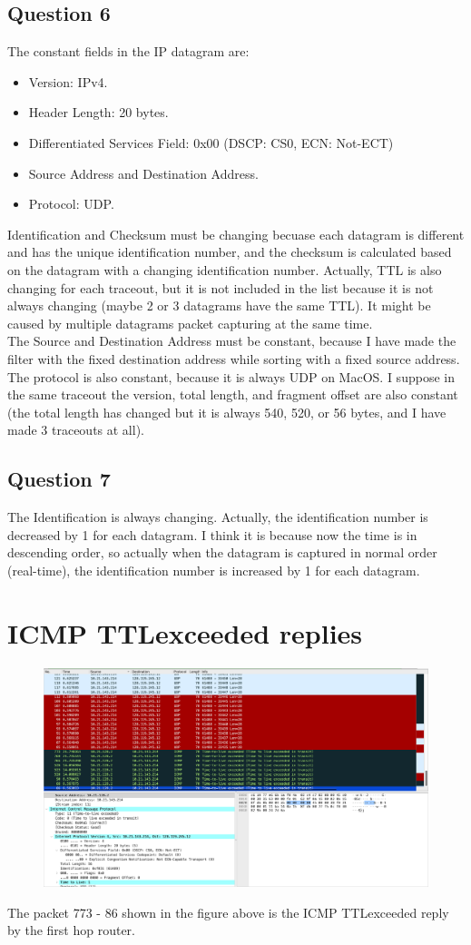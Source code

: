 \documentclass{article}
\begin{document}
\begin{CJK*}{UTF8}{gbsn}
\subsection{Question 6}
The constant fields in the IP datagram are:
\begin{itemize}
    \item Version: IPv4.
    \item Header Length: 20 bytes.
    \item Differentiated Services Field: 0x00 (DSCP: CS0, ECN: Not-ECT)
    \item Source Address and Destination Address.
    \item Protocol: UDP.
\end{itemize}
Identification and Checksum must be changing becuase each datagram is different and has the unique identification number, and the checksum is calculated based on the datagram with a changing identification number. Actually,
TTL is also changing for each traceout, but it is not included in the list because it is not always changing (maybe 2 or 3 datagrams have the same TTL). It might be caused by multiple datagrams packet capturing at the same time.
\\The Source and Destination Address must be constant, because I have made the filter with the fixed destination address while sorting with a fixed source address. The
protocol is also constant, because it is always UDP on MacOS. I suppose in the same traceout the version, total length, and fragment offset are also constant (the total length has changed but it is always 540, 520, or 56 bytes,
and I have made 3 traceouts at all).
\subsection{Question 7}
The Identification is always changing. Actually, the identification number is decreased by 1 for each datagram.
I think it is because now the time is in descending order, so actually when the datagram is captured in normal order (real-time), the identification number is increased by 1 for each datagram.
\section{ICMP TTLexceeded replies}
\begin{figure}[H]
    \centering
    \includegraphics[width=1.0\textwidth]{8.png}
\end{figure}
The packet 773 - 86 shown in the figure above is the ICMP TTLexceeded reply by the first hop router. 

\end{CJK*}
\end{document}
